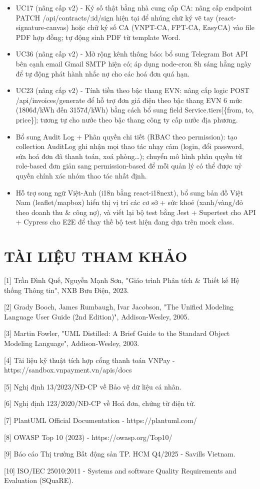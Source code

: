 \documentclass[a4paper,oneside]{report}
\newcommand{\chuongkhongso}[1]{%
  \chapter*{#1}%
  \addcontentsline{toc}{chapter}{#1}}
\begin{document}
\begin{itemize}
  chuyển sang merchant VNPay production, bổ sung ví MoMo, biên lai PDF
  tự động và đối soát giao dịch định kỳ.
\item
  UC17 (nâng cấp v2) - Ký số thật bằng nhà cung cấp CA: nâng cấp
  endpoint PATCH /api/contracts/:id/sign hiện tại để nhúng chữ ký vẽ tay
  (react-signature-canvas) hoặc chữ ký số CA (VNPT-CA, FPT-CA, EasyCA)
  vào file PDF hợp đồng; tự động sinh PDF từ template Word.
\item
  UC36 (nâng cấp v2) - Mở rộng kênh thông báo: bổ sung Telegram Bot API
  bên cạnh email Gmail SMTP hiện có; áp dụng node-cron 8h sáng hằng ngày
  để tự động phát hành nhắc nợ cho các hoá đơn quá hạn.
\item
  UC23 (nâng cấp v2) - Tính tiền theo bậc thang EVN: nâng cấp logic POST
  /api/invoices/generate để hỗ trợ đơn giá điện theo bậc thang EVN 6 mức
  (1806đ/kWh đến 3157đ/kWh) bằng cách bổ sung field
  Service.tiers{[}\{from, to, price\}{]}; tương tự cho nước theo bậc
  thang công ty cấp nước địa phương.
\item
  Bổ sung Audit Log + Phân quyền chi tiết (RBAC theo permission): tạo
  collection AuditLog ghi nhận mọi thao tác nhạy cảm (login, đổi
  password, sửa hoá đơn đã thanh toán, xoá phòng\ldots); chuyển mô hình
  phân quyền từ role-based đơn giản sang permission-based để mỗi quản lý
  có thể được uỷ quyền chính xác nhóm thao tác nhất định.
\item
  Hỗ trợ song ngữ Việt-Anh (i18n bằng react-i18next), bổ sung bản đồ
  Việt Nam (leaflet/mapbox) hiển thị vị trí các cơ sở + sức khoẻ
  (xanh/vàng/đỏ theo doanh thu \& công nợ), và viết lại bộ test bằng
  Jest + Supertest cho API + Cypress cho E2E để thay thế bộ test hiện
  đang dựa trên mock class.
\end{itemize}


\chuongkhongso{TÀI LIỆU THAM KHẢO}

{[}1{]} Trần Đình Quế, Nguyễn Mạnh Sơn, "Giáo trình Phân tích \& Thiết
kế Hệ thống Thông tin", NXB Bưu Điện, 2023.

{[}2{]} Grady Booch, James Rumbaugh, Ivar Jacobson, "The Unified
Modeling Language User Guide (2nd Edition)", Addison-Wesley, 2005.

{[}3{]} Martin Fowler, "UML Distilled: A Brief Guide to the Standard
Object Modeling Language", Addison-Wesley, 2003.

{[}4{]} Tài liệu kỹ thuật tích hợp cổng thanh toán VNPay -
https://sandbox.vnpayment.vn/apis/docs

{[}5{]} Nghị định 13/2023/NĐ-CP về Bảo vệ dữ liệu cá nhân.

{[}6{]} Nghị định 123/2020/NĐ-CP về Hoá đơn, chứng từ điện tử.

{[}7{]} PlantUML Official Documentation - https://plantuml.com/

{[}8{]} OWASP Top 10 (2023) - https://owasp.org/Top10/

{[}9{]} Báo cáo Thị trường Bất động sản TP. HCM Q4/2025 - Savills
Vietnam.

{[}10{]} ISO/IEC 25010:2011 - Systems and software Quality Requirements
and Evaluation (SQuaRE).
\end{document}
